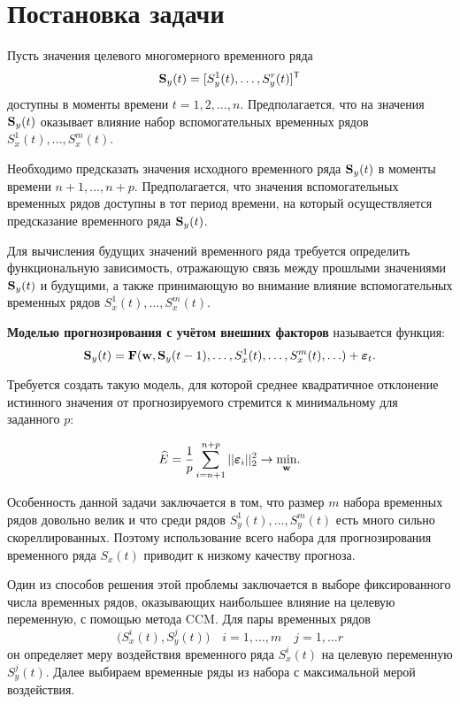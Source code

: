 \documentclass[a4paper, 12pt]{article}
\begin{document}
\section{Постановка задачи}
Пусть значения целевого многомерного временного ряда 
\[\mathbf{S}_y(t) = [S_y^1(t), \ldots, S_y^r(t)]^{\mathsf{T}}\]
доступны в моменты времени $t = 1, 2, \ldots, n$. Предполагается, что на значения $\mathbf{S}_y(t)$ оказывает влияние набор вспомогательных временных рядов $S_x^1(t), \ldots, S_x^m(t)$.

Необходимо предсказать значения исходного временного ряда $\mathbf{S}_y(t)$ в моменты времени $n+1, \ldots, n+p$. 
Предполагается, что значения вспомогательных временных рядов доступны в тот период времени, на который осуществляется предсказание временного ряда $\mathbf{S}_y(t)$.

Для вычисления будущих значений временного ряда требуется определить функциональную зависимость, отражающую связь между прошлыми значениями $\mathbf{S}_y(t)$ и будущими, а также принимающую во внимание влияние вспомогательных временных рядов $S_x^1(t), \ldots, S_x^m(t)$.

\begin{definition}
	\textbf{Моделью прогнозирования с учётом внешних факторов} называется функция:
	\begin{equation*}
		\mathbf{S}_y(t) = \mathbf{F}(\mathbf{w}, \mathbf{S}_y(t-1), \ldots, S_x^1(t), \ldots, S_x^m(t), \ldots) + \boldsymbol{\varepsilon}_t.
	\end{equation*}
\end{definition}

Требуется создать такую модель, для которой среднее квадратичное отклонение истинного значения от прогнозируемого стремится к минимальному для заданного $p$: 

\begin{equation*}
	\widehat{E} = \dfrac{1}{p} \sum\limits_{i=n+1}^{n+p} ||\boldsymbol{\varepsilon}_i||_2^2 \rightarrow \underset{\mathbf{w}}{\text{min}}.
\end{equation*}

Особенность данной задачи заключается в том, что размер $m$ набора временных рядов довольно велик и что среди рядов $S_y^1(t), \ldots, S_y^m(t)$ есть много сильно скореллированных. 
Поэтому использование всего набора для прогнозирования временного ряда $S_x(t)$ приводит к низкому качеству прогноза. 

Один из способов решения этой проблемы заключается в выборе фиксированного числа временных рядов, оказывающих наибольшее влияние на целевую переменную, с помощью метода CCM. 
Для пары временных рядов
\begin{equation*}
\bigl(S_x^i(t), S_y^j(t) \bigr) \quad i = 1, \ldots, m \quad j = 1, \ldots r
\end{equation*} 
он определяет меру воздействия временного ряда $S_x^i(t)$ на целевую переменную $S_y^j(t)$. 
Далее выбираем временные ряды из набора с максимальной мерой воздействия.
\end{document}
